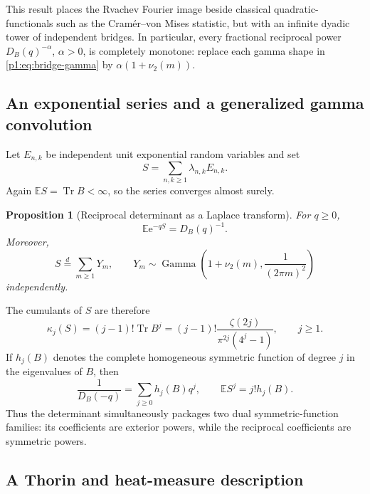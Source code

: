 \documentclass[11pt,oneside]{article}
\newtheorem{proposition}[theorem]{Proposition}
\theoremstyle{definition}
\newcommand{\e}{\mathrm e}
\newcommand{\E}{\mathbb E}
\newcommand{\Tr}{\operatorname{Tr}}
\newcommand{\vtwo}{\nu_2}
\begin{document}
This result places the Rvachev Fourier image beside classical quadratic-functionals
such as the Cram\'er--von Mises statistic, but with an infinite dyadic tower of
independent bridges.  In particular, every fractional reciprocal power
\(D_B(q)^{-\alpha}\), \(\alpha>0\), is completely monotone: replace each gamma shape
in \eqref{p1:eq:bridge-gamma} by \(\alpha(1+\vtwo(m))\).

\subsection{An exponential series and a generalized gamma convolution}

Let \(E_{n,k}\) be independent unit exponential random variables and set
\begin{equation}
 S=\sum_{n,k\ge1}\lambda_{n,k}E_{n,k}.
 \label{p1:eq:S-exp}
\end{equation}
Again \(\E S=\Tr B<\infty\), so the series converges almost surely.

\begin{proposition}[Reciprocal determinant as a Laplace transform]
\label{p1:prop:exp-det}
For \(q\ge0\),
\begin{equation}
 \boxed{\quad
 \E\e^{-qS}=D_B(q)^{-1}.
 \quad}
 \label{p1:eq:exp-det}
\end{equation}
Moreover,
\begin{equation}
 S\stackrel d=\sum_{m\ge1}Y_m,
 \qquad
 Y_m\sim\operatorname{Gamma}
 \left(1+\vtwo(m),\frac1{(2\pi m)^2}\right)
 \label{p1:eq:S-gamma}
\end{equation}
independently.
\end{proposition}

The cumulants of \(S\) are therefore
\begin{equation}
 \kappa_j(S)=(j-1)!\Tr B^j
 =(j-1)!\frac{\zeta(2j)}{\pi^{2j}(4^j-1)},
 \qquad j\ge1.
 \label{p1:eq:S-cumulants}
\end{equation}
If \(h_j(B)\) denotes the complete homogeneous symmetric function of degree \(j\) in
the eigenvalues of \(B\), then
\begin{equation}
 \frac1{D_B(-q)}=\sum_{j\ge0}h_j(B)q^j,
 \qquad
 \E S^j=j!h_j(B).
 \label{p1:eq:h-complete}
\end{equation}
Thus the determinant simultaneously packages two dual symmetric-function families:
its coefficients are exterior powers, while the reciprocal coefficients are symmetric
powers.

\subsection{A Thorin and heat-measure description}
\end{document}
